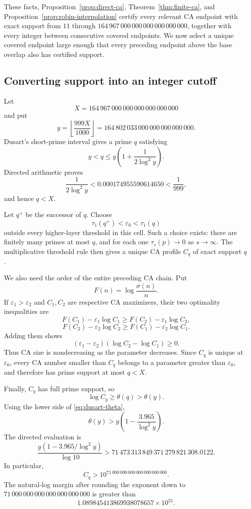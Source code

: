 \documentclass[11pt,a4paper]{article}
\numberwithin{equation}{section}
\theoremstyle{definition}
\newcommand{\Xmax}{164\,967\,000\,000\,000\,000\,000\,000}
\newcommand{\Kcut}{71\,000\,000\,000\,000\,000\,000\,000}
\begin{document}
These facts, Proposition~\ref{prop:direct-ca}, Theorem~\ref{thm:finite-ca},
and Proposition~\ref{prop:robin-interpolation} certify every relevant CA
endpoint with exact support from \(11\) through \(\Xmax\), together with every
integer between consecutive covered endpoints.  We now select a unique
covered endpoint large enough that every preceding endpoint above the base
overlap also has certified support.

\subsection{Converting support into an integer cutoff}

Let
\[
  X=\Xmax
\]
and put
\[
  y=\left\lfloor\frac{999X}{1000}\right\rfloor
  =
  164\,802\,033\,000\,000\,000\,000\,000.
\]
Dusart's short-prime interval gives a prime \(q\) satisfying
\[
  y<q\le
  y\left(1+\frac1{2\log^2y}\right).
\]
Directed arithmetic proves
\[
  \frac1{2\log^2y}
  <
  0.000174955590614650
  <
  \frac1{999},
\]
and hence \(q<X\).

Let \(q^+\) be the successor of \(q\).  Choose
\[
  \tau_1(q^+)<\varepsilon_0<\tau_1(q)
\]
outside every higher-layer threshold in this cell.  Such a choice exists:
there are finitely many primes at most \(q\), and for each one
\(\tau_s(p)\to0\) as \(s\to\infty\).  The multiplicative threshold rule then
gives a unique CA profile \(C_q\) of exact support \(q\).

We also need the order of the entire preceding CA chain.  Put
\[
  F(n)=\log\frac{\sigma(n)}n.
\]
If \(\varepsilon_1>\varepsilon_2\) and \(C_1,C_2\) are respective CA
maximizers, their two optimality inequalities are
\[
  F(C_1)-\varepsilon_1\log C_1
  \ge F(C_2)-\varepsilon_1\log C_2,
\]
\[
  F(C_2)-\varepsilon_2\log C_2
  \ge F(C_1)-\varepsilon_2\log C_1.
\]
Adding them shows
\[
  (\varepsilon_1-\varepsilon_2)
  (\log C_2-\log C_1)\ge0.
\]
Thus CA size is nondecreasing as the parameter decreases.  Since
\(C_q\) is unique at \(\varepsilon_0\), every CA number smaller than \(C_q\)
belongs to a parameter greater than \(\varepsilon_0\), and therefore has
prime support at most \(q<X\).

Finally, \(C_q\) has full prime support, so
\[
  \log C_q\ge\theta(q)>\theta(y).
\]
Using the lower side of \eqref{eq:dusart-theta},
\[
  \theta(y)>
  y\left(1-\frac{3.965}{\log^2y}\right).
\]
The directed evaluation is
\[
  \frac{
  y\left(1-3.965/\log^2y\right)
  }{\log 10}
  >
  71\,473\,313\,849\,371\,279\,821\,308.0122.
\]
In particular,
\[
  C_q>10^{\Kcut}.
\]
The natural-log margin after rounding the exponent down to \(\Kcut\) is
greater than
\[
  1.089845413869938078657\times10^{21}.
\]
\end{document}

